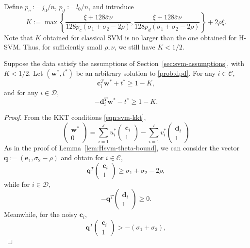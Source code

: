 \documentclass[twoside,11pt]{article}
\renewcommand{\c}{\bm{c}}
\renewcommand{\d}{\bm{d}}
\newcommand\q{\bm{q}}
\newcommand\w{\bm{w}}
\newcommand\e{\bm{e}}
\newcommand\CC{\mathcal{C}}
\newcommand\DD{\mathcal{D}}
\begin{document}
Define $p_c := j_0/n$, $p_d := l_0/n$, and introduce
\[
    K := \max\left\{\frac{\xi + 128\bar{\sigma}\nu}{128p_c(\sigma_1 + \sigma_2 - 2\rho)}, \frac{\xi + 128\bar{\sigma}\nu}{128p_d(\sigma_1 + \sigma_2 - 2\rho)}\right\} + 2\rho\xi.
\]
Note that $K$ obtained for classical SVM is no larger than the one obtained for H-SVM. Thus, for sufficiently small $\rho,\nu$, we still have $K < 1/2$.
\begin{theorem} \label{thm:Csvm-1minKmargin}
    Suppose the data satisfy the assumptions of Section~\ref{sec:svm-assumptions}, with $K<1/2$. Let $(\w^*,t^*)$ be an arbitrary solution to \eqref{prob:dpd}. For any $i \in \CC$,
    \[
        \c_i^T\w^* + t^* \geq 1 - K,
    \]
    and for any $i \in \DD$,
    \[
        -\d_i^T\w^* - t^* \geq 1 - K.
    \]
\end{theorem}
\begin{proof}
    From the KKT conditions \eqref{eqn:svm-kkt},
    \begin{equation} \label{eqn:Csvm-margin-bound-kkt-rel}
        \begin{pmatrix}
            \w^*\\
            0
        \end{pmatrix} = \sum_{i=1}^j u_i^*\begin{pmatrix}
            \c_i\\
            1
        \end{pmatrix} - \sum_{i=1}^l v_i^*\begin{pmatrix}
            \d_i\\
            1
        \end{pmatrix}
    \end{equation}
    As in the proof of Lemma~\ref{lem:Hsvm-theta-bound}, we can consider the vector $\q := (\e_1,\sigma_2 - \rho)$ and obtain for $i \in \CC$,
    \[
        \q^T\begin{pmatrix}
            \c_i\\
            1
        \end{pmatrix} \geq \sigma_1 + \sigma_2 - 2\rho,
    \]
    while for $i \in \DD$,
    \[
        -\q^T\begin{pmatrix}
            \d_i\\
            1
        \end{pmatrix} \geq 0.
    \]
    Meanwhile, for the noisy $\c_i$,
    \[
        \q^T\begin{pmatrix}
            \c_i\\
            1
        \end{pmatrix} > -(\sigma_1 + \sigma_2),
\]
\end{proof}
\end{document}
